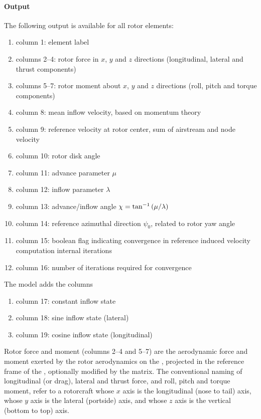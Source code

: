 \paragraph{Output}
The following output is available for all rotor elements:
\begin{enumerate}
\item column 1: element label
\item columns 2--4: rotor force in $x$, $y$ and $z$ directions
	(longitudinal, lateral and thrust components)
\item columns 5--7: rotor moment about $x$, $y$ and $z$ directions
	(roll, pitch and torque components)
\item column 8: mean inflow velocity, based on momentum theory
\item column 9: reference velocity at rotor center, sum of airstream
	and  node velocity
\item column 10: rotor disk angle
\item column 11: advance parameter $\mu$
\item column 12: inflow parameter $\lambda$
\item column 13: advance/inflow angle $\chi=\tan^{-1}\left( \mu/\lambda \right)$
\item column 14: reference azimuthal direction $\psi_0$,
	related to rotor yaw angle
\item column 15: boolean flag indicating convergence
	in reference induced velocity computation internal iterations
\item column 16: number of iterations required for convergence
\setcounter{elem_rotor_output}{\value{enumi}}
\end{enumerate}
The  model adds the columns
\begin{enumerate}
\setcounter{enumi}{\value{elem_rotor_output}}
\item column 17: constant inflow state
\item column 18: sine inflow state (lateral)
\item column 19: cosine inflow state (longitudinal)
\end{enumerate}
Rotor force and moment (columns 2--4 and 5--7) are the aerodynamic
force and moment exerted by the rotor aerodynamics on the ,
projected in the reference frame of the ,
optionally modified by the  matrix.
The conventional naming of longitudinal (or drag), lateral and thrust force,
and roll, pitch and torque moment, refer to a rotorcraft
whose $x$ axis is the longitudinal (nose to tail) axis,
whose $y$ axis is the lateral (portside) axis,
and whose $z$ axis is the vertical (bottom to top) axis.

